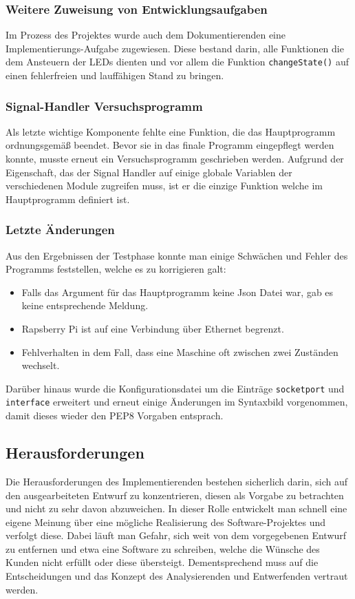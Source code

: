 \subsubsection{Weitere Zuweisung von Entwicklungsaufgaben}
Im Prozess des Projektes wurde auch dem Dokumentierenden eine Implementierungs-Aufgabe zugewiesen. Diese bestand darin, alle Funktionen die dem Ansteuern der LEDs dienten und vor allem die Funktion \texttt{changeState()} auf einen fehlerfreien und lauffähigen Stand zu bringen.

\subsubsection{Signal-Handler Versuchsprogramm}
Als letzte wichtige Komponente fehlte eine Funktion, die das Hauptprogramm ordnungsgemäß beendet. Bevor sie in das finale Programm eingepflegt werden konnte, musste erneut ein Versuchsprogramm geschrieben werden. Aufgrund der Eigenschaft, das der Signal Handler auf einige globale Variablen der verschiedenen Module zugreifen muss, ist er die einzige Funktion welche im Hauptprogramm definiert ist.

\subsubsection{Letzte Änderungen}
Aus den Ergebnissen der Testphase konnte man einige Schwächen und Fehler des Programms feststellen, welche es zu korrigieren galt:
\begin{itemize}
	\item Falls das Argument für das Hauptprogramm keine Json Datei war, gab es keine entsprechende Meldung.
	\item Rapsberry Pi ist auf eine Verbindung über Ethernet begrenzt.
	\item Fehlverhalten in dem Fall, dass eine Maschine oft zwischen zwei Zuständen wechselt.
\end{itemize}
Darüber hinaus wurde die Konfigurationsdatei um die Einträge \texttt{socketport} und \texttt{interface} erweitert und erneut einige Änderungen im Syntaxbild vorgenommen, damit dieses wieder den PEP8 Vorgaben entsprach.

\subsection{Herausforderungen}
Die Herausforderungen des Implementierenden bestehen sicherlich darin, sich auf den ausgearbeiteten Entwurf zu konzentrieren, diesen als Vorgabe zu betrachten und nicht zu sehr davon abzuweichen. In dieser Rolle entwickelt man schnell eine eigene Meinung über eine mögliche Realisierung des Software-Projektes und verfolgt diese. Dabei läuft man Gefahr, sich weit von dem vorgegebenen Entwurf zu entfernen und etwa eine Software zu schreiben, welche die Wünsche des Kunden nicht erfüllt oder diese übersteigt. Dementsprechend muss auf die Entscheidungen und das Konzept des Analysierenden und Entwerfenden vertraut werden.

